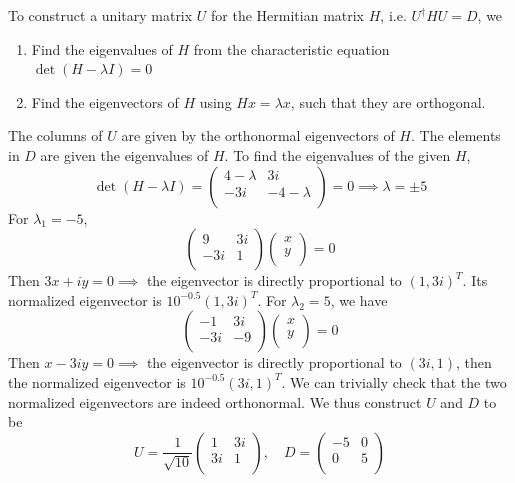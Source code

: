\documentclass[a4paper]{article}
\begin{document}
\begin{ans}
To construct a unitary matrix $U$ for the Hermitian matrix $H$, i.e. $U^\dag HU=D$, we 
\begin{enumerate}
    \item Find the eigenvalues of $H$ from the characteristic equation $\det(H-\lambda I)=0$
    \item Find the eigenvectors of $H$ using $Hx=\lambda x$, such that they are orthogonal.
\end{enumerate}
The columns of $U$ are given by the orthonormal eigenvectors of $H$. The elements in $D$ are given the eigenvalues of $H$. To find the eigenvalues of the given $H$,
$$\det(H-\lambda I)=\begin{pmatrix}4-\lambda&3i\\-3i&-4-\lambda\\\end{pmatrix}=0\implies\lambda=\pm5$$
For $\lambda_1=-5$,
$$\begin{pmatrix}9&3i\\-3i&1\\\end{pmatrix}\begin{pmatrix}x\\y\\\end{pmatrix}=0$$
Then $3x+iy=0\implies$ the eigenvector is directly proportional to $(1,3i)^T$. Its normalized eigenvector is $10^{-0.5}(1,3i)^T$. For $\lambda_2=5$, we have
$$\begin{pmatrix}-1&3i\\-3i&-9\\\end{pmatrix}\begin{pmatrix}x\\y\\\end{pmatrix}=0$$
Then $x-3iy=0\implies$ the eigenvector is directly proportional to $(3i,1)$, then the normalized eigenvector is $10^{-0.5}(3i,1)^T$. We can trivially check that the two normalized eigenvectors are indeed orthonormal. We thus construct $U$ and $D$ to be
$$U=\frac{1}{\sqrt{10}}\begin{pmatrix}1&3i\\3i&1\\\end{pmatrix},\quad D=\begin{pmatrix}-5&0\\0&5\\\end{pmatrix}$$
\end{ans}
\end{document}
